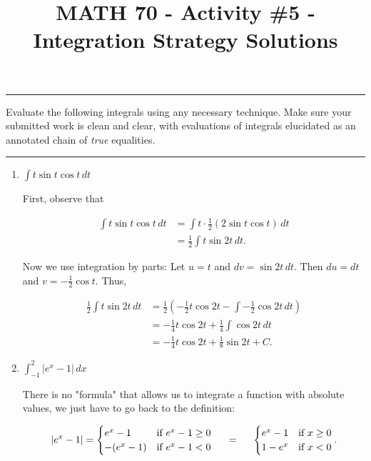 \documentclass[12pt,oneside,english]{amsart}
\begin{document}
\title{MATH 70 - Activity \#5 - Integration Strategy Solutions}

\maketitle
\thispagestyle{empty}

\hrule

Evaluate the following integrals using any necessary technique. Make sure your submitted work is clean and clear, with evaluations of integrals elucidated as an annotated chain of \textit{true} equalities.

\medbreak
\hrule

\vspace{1cm}
\begin{enumerate}[leftmargin=*]
\setlength\itemsep{2cm}

\item $\displaystyle \int t\sin t\cos t\,dt$

First, observe that

\begin{align*}
\int t\sin t\cos t\,dt&=\int t\cdot\frac{1}{2}(2\sin t\cos t)\,dt \\
&=\frac{1}{2}\int t\sin2t\,dt.
\end{align*}

Now we use integration by parts: Let $u=t$ and $dv=\sin2t\,dt$. Then $du=dt$ and $v=-\frac{1}{2}\cos t$. Thus,

\begin{align*}
\frac{1}{2}\int t\sin2t\,dt&=\frac{1}{2}\left(-\frac{1}{2}t\cos2t-\int-\frac{1}{2}\cos2t\,dt\right) \\
&=-\frac{1}{4}t\cos2t+\frac{1}{4}\int\cos2t\,dt \\
&=-\frac{1}{4}t\cos2t+\frac{1}{8}\sin2t+C.
\end{align*}

\item $\displaystyle \int_{-1}^2|e^x-1|\,dx$

There is no "formula" that allows us to integrate a function with absolute values, we just have to go back to the definition:

\[
|e^x-1|=\begin{cases}
e^x-1 & \text{if }e^x-1\geq0 \\
-(e^x-1) & \text{if }e^x-1<0
\end{cases}
\hspace{0.5cm}=\hspace{0.5cm}\begin{cases}
e^x-1 & \text{if }x\geq0 \\
1-e^x & \text{if }x<0
\end{cases}.
\]


\end{enumerate}
\end{document}
